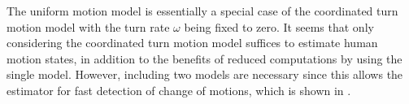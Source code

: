 \documentclass[journal]{IEEEtran}
\begin{document}
	The uniform motion model is essentially a special case of the coordinated turn motion model with the turn rate $\omega$ being fixed to zero.
	It seems that only considering the coordinated turn motion model suffices to estimate human motion states, in addition to the benefits of reduced computations by using the single model.
	However, including two models are necessary since this allows the estimator for fast detection of change of motions, which is shown in \cite{caveney2004multiple}.
	
	
\end{document}
